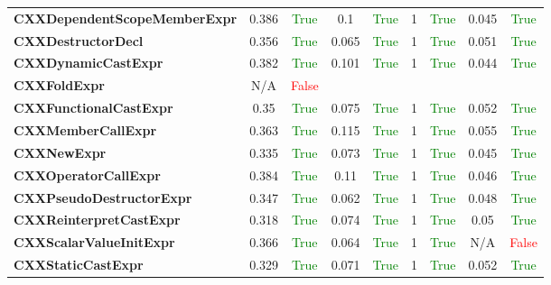 \documentclass{article}
\begin{document}
\begin{xltabular}{\textwidth}{lcccccccc}
\textbf{{\fontsize{10}{12}\selectfont CXXDependentScopeMemberExpr}}& 0.386&\textcolor{green}{True}& 0.1&\textcolor{green}{True}& 1&\textcolor{green}{True}& 0.045&\textcolor{green}{True} \\[0.5ex]
\textbf{{\fontsize{10}{12}\selectfont CXXDestructorDecl}}& 0.356&\textcolor{green}{True}& 0.065&\textcolor{green}{True}& 1&\textcolor{green}{True}& 0.051&\textcolor{green}{True} \\[0.5ex]
\textbf{{\fontsize{10}{12}\selectfont CXXDynamicCastExpr}}& 0.382&\textcolor{green}{True}& 0.101&\textcolor{green}{True}& 1&\textcolor{green}{True}& 0.044&\textcolor{green}{True} \\[0.5ex]
\textbf{{\fontsize{10}{12}\selectfont CXXFoldExpr}}& N/A&\textcolor{red}{False} \\[0.5ex]
\textbf{{\fontsize{10}{12}\selectfont CXXFunctionalCastExpr}}& 0.35&\textcolor{green}{True}& 0.075&\textcolor{green}{True}& 1&\textcolor{green}{True}& 0.052&\textcolor{green}{True} \\[0.5ex]
\textbf{{\fontsize{10}{12}\selectfont CXXMemberCallExpr}}& 0.363&\textcolor{green}{True}& 0.115&\textcolor{green}{True}& 1&\textcolor{green}{True}& 0.055&\textcolor{green}{True} \\[0.5ex]
\textbf{{\fontsize{10}{12}\selectfont CXXNewExpr}}& 0.335&\textcolor{green}{True}& 0.073&\textcolor{green}{True}& 1&\textcolor{green}{True}& 0.045&\textcolor{green}{True} \\[0.5ex]
\textbf{{\fontsize{10}{12}\selectfont CXXOperatorCallExpr}}& 0.384&\textcolor{green}{True}& 0.11&\textcolor{green}{True}& 1&\textcolor{green}{True}& 0.046&\textcolor{green}{True} \\[0.5ex]
\textbf{{\fontsize{10}{12}\selectfont CXXPseudoDestructorExpr}}& 0.347&\textcolor{green}{True}& 0.062&\textcolor{green}{True}& 1&\textcolor{green}{True}& 0.048&\textcolor{green}{True} \\[0.5ex]
\textbf{{\fontsize{10}{12}\selectfont CXXReinterpretCastExpr}}& 0.318&\textcolor{green}{True}& 0.074&\textcolor{green}{True}& 1&\textcolor{green}{True}& 0.05&\textcolor{green}{True} \\[0.5ex]
\textbf{{\fontsize{10}{12}\selectfont CXXScalarValueInitExpr}}& 0.366&\textcolor{green}{True}& 0.064&\textcolor{green}{True}& 1&\textcolor{green}{True}& N/A&\textcolor{red}{False} \\[0.5ex]
\textbf{{\fontsize{10}{12}\selectfont CXXStaticCastExpr}}& 0.329&\textcolor{green}{True}& 0.071&\textcolor{green}{True}& 1&\textcolor{green}{True}& 0.052&\textcolor{green}{True} \\[0.5ex]

\end{xltabular}
\end{document}
